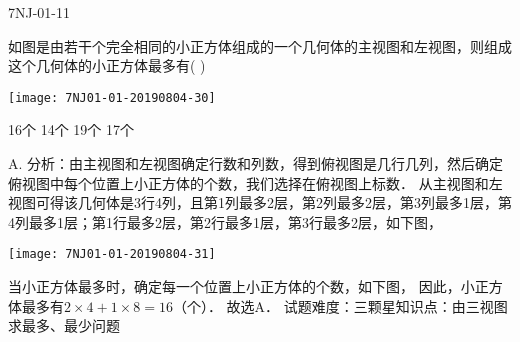 \begin{defproblem}{7NJ-01-11}%
\begin{onlyproblem}%
如图是由若干个完全相同的小正方体组成的一个几何体的主视图和左视图，则组成这个几何体的小正方体最多有(    ) 
\begin{center}
\texttt{[image: 7NJ01-01-20190804-30]}
\end{center}

\xx
{16个}
{14个}
{19个}
{17个}

\end{onlyproblem}%
\begin{onlysolution}%
\begin{solution}%
A. 
分析：由主视图和左视图确定行数和列数，得到俯视图是几行几列，然后确定俯视图中每个位置上小正方体的个数，我们选择在俯视图上标数． 从主视图和左视图可得该几何体是3行4列，且第1列最多2层，第2列最多2层，第3列最多1层，第4列最多1层；第1行最多2层，第2行最多1层，第3行最多2层，如下图，
\begin{center}
\texttt{[image: 7NJ01-01-20190804-31]}
\end{center} 
当小正方体最多时，确定每一个位置上小正方体的个数，如下图，   因此，小正方体最多有$2\times4+1\times8=16$（个）． 故选A． 
试题难度：三颗星知识点：由三视图求最多、最少问题  

\end{solution}%
\end{onlysolution}%
\end{defproblem}






